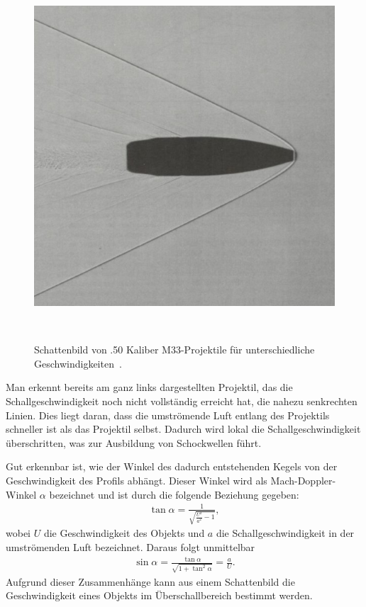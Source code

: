 \begin{figure}
\begin{minipage}[b]{0.32\textwidth}
        \caption*{$1.06\,\mathrm{Mach}$}
    \end{minipage}
    \hfill
    \begin{minipage}[b]{0.32\textwidth}
        \centering
        \includegraphics[width=\linewidth]{papers/ueberschall/figures/2.66_mach_projektil.jpg}
        \caption*{$2.66\,\mathrm{Mach}$}
    \end{minipage}
    \caption{Schattenbild von .50 Kaliber M33-Projektile für unterschiedliche Geschwindigkeiten~\cite{Mittelkaliber2020}.}
~\label{fig:machsche_kegel_projektil}
\end{figure}
Man erkennt bereits am ganz links dargestellten Projektil, 
das die Schallgeschwindigkeit noch nicht vollständig 
erreicht hat, die nahezu senkrechten Linien. 
Dies liegt daran, dass die umströmende Luft entlang 
des Projektils schneller ist als das Projektil selbst. 
Dadurch wird lokal die Schallgeschwindigkeit überschritten, 
was zur Ausbildung von Schockwellen führt.

Gut erkennbar ist, wie der Winkel des dadurch entstehenden 
Kegels von der Geschwindigkeit des Profils abhängt. 
Dieser Winkel wird als Mach-Doppler-Winkel $\alpha$ 
bezeichnet und ist durch die folgende Beziehung gegeben:
\begin{align*}
      \tan \alpha 
      = 
      \frac{1}{\sqrt{\frac{U^2}{a^2} - 1}},
\end{align*}
wobei $U$ die Geschwindigkeit des Objekts und $a$ 
die Schallgeschwindigkeit in der umströmenden Luft 
bezeichnet. 
Daraus folgt unmittelbar
\begin{align*}
      \sin \alpha 
      = 
      \frac{\tan \alpha}{\sqrt{1 + \tan^2 \alpha}} 
      = 
      \frac{a}{U}.
\end{align*}
Aufgrund dieser Zusammenhänge kann aus einem Schattenbild 
die Geschwindigkeit eines Objekts im Überschallbereich 
bestimmt werden.


